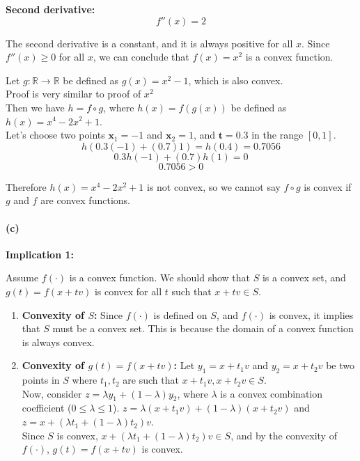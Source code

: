 \documentclass[12pt]{article}
\begin{document}
\textbf{Second derivative:}
\[ f''(x) = 2 \]

The second derivative is a constant, and it is always positive for all \( x \). Since \( f''(x) \geq 0 \) for all \( x \), we can conclude that \( f(x) = x^2 \) is a convex function. 

Let \( g: \mathbb{R} \rightarrow \mathbb{R} \) be defined as \( g(x) = x^2-1 \), which is also convex. \\

Proof is very similar to proof of \( x^2 \)\\

Then we have \( h = f \circ g \), where \( h(x) = f(g(x)) \) be defined as \( h(x) = x^4-2x^2+1 \). \\

Let's choose two points $\mathbf{x}_1 = -1$ and $\mathbf{x}_2 = 1$, and $\mathbf{t} = 0.3$ in the range $[0, 1]$. \\
\[
    h(0.3(-1) + (0.7)1) = h(0.4) = 0.7056
\]
\[
    0.3h(-1) + (0.7)h(1) = 0
\]
\[
    0.7056 > 0
\]


Therefore \( h(x) = x^4-2x^2+1 \) is not convex, so we cannot say \( f \circ g \) is convex if \( g \) and \( f \) are convex functions.
\paragraph{(c)}

\textbf{Implication 1:}

Assume \( f(·) \) is a convex function. We should show that \( S \) is a convex set, and \( g(t) = f(x + tv) \) is convex for all \( t \) such that \( x + tv \in S \).

\begin{enumerate}
    \item \textbf{Convexity of \( S \):} Since \( f(·) \) is defined on \( S \), and \( f(·) \) is convex, it implies that \( S \) must be a convex set. This is because the domain of a convex function is always convex.
    
    \item \textbf{Convexity of \( g(t) = f(x + tv) \):} Let \( y_1 = x + t_1v \) and \( y_2 = x + t_2v \) be two points in \( S \) where \( t_1, t_2 \) are such that \( x + t_1v, x + t_2v \in S \). \\
    Now, consider \( z = \lambda y_1 + (1 - \lambda) y_2 \), where \( \lambda \) is a convex combination coefficient (\( 0 \leq \lambda \leq 1 \)). \( z = \lambda (x + t_1v) + (1 - \lambda)(x + t_2v) \) and \( z = x + (\lambda t_1 + (1 - \lambda)t_2)v \). \\
    Since \( S \) is convex, \( x + (\lambda t_1 + (1 - \lambda)t_2)v \in S \), and by the convexity of \( f(·) \), \( g(t) = f(x + tv) \) is convex.
\end{enumerate}
\end{document}
